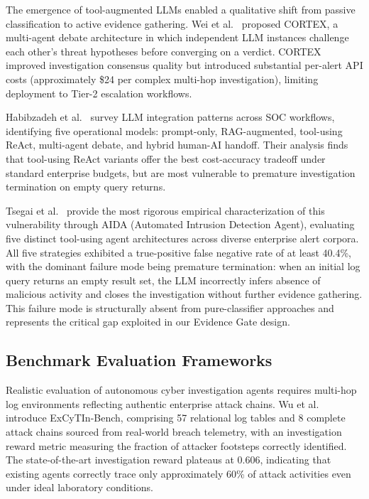 The emergence of tool-augmented LLMs enabled a qualitative shift from passive
classification to active evidence gathering. Wei et al.~\cite{wei2025cortex}
proposed CORTEX, a multi-agent debate architecture in which independent LLM
instances challenge each other's threat hypotheses before converging on a verdict.
CORTEX improved investigation consensus quality but introduced substantial per-alert
API costs (approximately \$24 per complex multi-hop investigation), limiting
deployment to Tier-2 escalation workflows.

Habibzadeh et al.~\cite{habibzadeh2025llmsoc} survey LLM integration patterns
across SOC workflows, identifying five operational models: prompt-only, RAG-augmented,
tool-using ReAct, multi-agent debate, and hybrid human-AI handoff. Their analysis
finds that tool-using ReAct variants offer the best cost-accuracy tradeoff under
standard enterprise budgets, but are most vulnerable to premature investigation
termination on empty query returns.

Tsegai et al.~\cite{tsegai2026aida} provide the most rigorous empirical characterization
of this vulnerability through AIDA (Automated Intrusion Detection Agent), evaluating five
distinct tool-using agent architectures across diverse enterprise alert
corpora. All five strategies exhibited a true-positive false negative rate of at
least 40.4\%, with the dominant failure mode being premature termination: when an
initial log query returns an empty result set, the LLM incorrectly infers absence
of malicious activity and closes the investigation without further evidence gathering.
This failure mode is structurally absent from pure-classifier approaches and
represents the critical gap exploited in our Evidence Gate design.

\subsection{Benchmark Evaluation Frameworks}

Realistic evaluation of autonomous cyber investigation agents requires multi-hop log
environments reflecting authentic enterprise attack chains. Wu et al.~\cite{wu2026excytin}
introduce ExCyTIn-Bench, comprising 57 relational log tables and 8 complete attack
chains sourced from real-world breach telemetry, with an investigation reward metric
measuring the fraction of attacker footsteps correctly identified. The state-of-the-art
investigation reward plateaus at 0.606, indicating that existing agents correctly trace
only approximately 60\% of attack activities even under ideal laboratory conditions.

